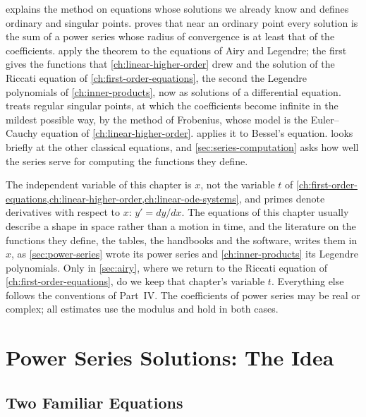  explains the method on equations whose solutions we already know and defines ordinary and singular points.  proves that near an ordinary point every solution is the sum of a power series whose radius of convergence is at least that of the coefficients.  apply the theorem to the equations of Airy and Legendre; the first gives the functions that \cref{ch:linear-higher-order} drew and the solution of the Riccati equation of \cref{ch:first-order-equations}, the second the Legendre polynomials of \cref{ch:inner-products}, now as solutions of a differential equation.  treats regular singular points, at which the coefficients become infinite in the mildest possible way, by the method of Frobenius, whose model is the Euler--Cauchy equation of \cref{ch:linear-higher-order}.  applies it to Bessel's equation.  looks briefly at the other classical equations, and \cref{sec:series-computation} asks how well the series serve for computing the functions they define.

The independent variable of this chapter is $x$, not the variable $t$ of \cref{ch:first-order-equations,ch:linear-higher-order,ch:linear-ode-systems}, and primes denote derivatives with respect to $x$: $y'=dy/dx$. The equations of this chapter usually describe a shape in space rather than a motion in time, and the literature on the functions they define, the tables, the handbooks and the software, writes them in $x$, as \cref{sec:power-series} wrote its power series and \cref{ch:inner-products} its Legendre polynomials. Only in \cref{sec:airy}, where we return to the Riccati equation of \cref{ch:first-order-equations}, do we keep that chapter's variable $t$. Everything else follows the conventions of Part~IV. The coefficients of power series may be real or complex; all estimates use the modulus and hold in both cases.

\section{Power Series Solutions: The Idea}
\label{sec:series-idea}

\subsection{Two Familiar Equations}

